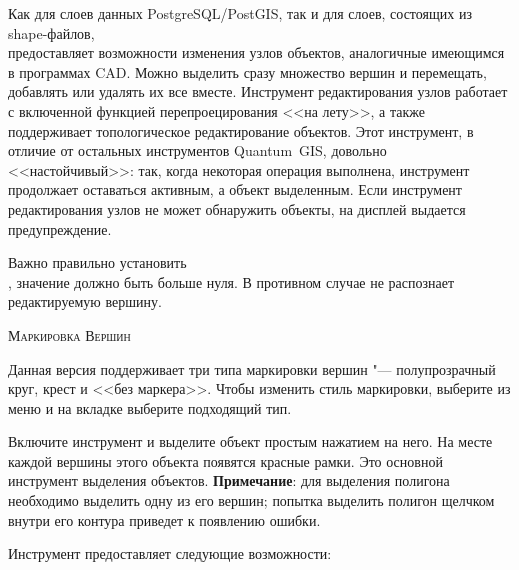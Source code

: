 
Как для слоев данных PostgreSQL/PostGIS, так и для слоев, состоящих из
shape-файлов, \\
 предоставляет
возможности изменения узлов объектов, аналогичные имеющимся в программах CAD.
Можно выделить сразу множество вершин и перемещать, добавлять или удалять
их все вместе. Инструмент редактирования узлов работает с включенной функцией
перепроецирования <<на лету>>, а также поддерживает топологическое редактирование
объектов. Этот инструмент, в отличие от остальных инструментов Quantum~GIS,
довольно <<настойчивый>>: так, когда некоторая операция выполнена, инструмент
продолжает оставаться активным, а объект выделенным. Если инструмент
редактирования узлов не может обнаружить объекты, на дисплей выдается
предупреждение.

Важно правильно установить  \arrow
{} \arrow
{} \arrow \\ , значение должно быть
больше нуля. В противном случае \qg не распознает редактируемую вершину.

\begin{Tip}\caption{\textsc{Маркировка Вершин}}
Данная версия \qg поддерживает три типа маркировки вершин "--- полупрозрачный
круг, крест и <<без маркера>>. Чтобы изменить стиль маркировки, выберите
 из меню 
и на вкладке  выберите подходящий тип.
\end{Tip}


Включите инструмент  и
выделите объект простым нажатием на него. На месте каждой вершины этого
объекта появятся красные рамки. Это основной инструмент выделения объектов.
\textbf{Примечание}: для выделения полигона необходимо выделить одну из
его вершин; попытка выделить полигон щелчком внутри его контура приведет
к появлению ошибки.

Инструмент предоставляет следующие возможности:

